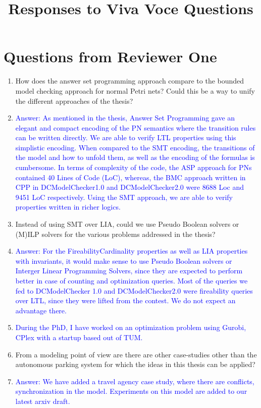 \documentclass{article}
\title{Responses to Viva Voce Questions}
\author{}
\date{}
\newcommand{\answer}[1]{\item[] \textcolor{blue}{Answer: #1}}
\begin{document}
\maketitle

\section{Questions from Reviewer One}
\begin{enumerate}
      \item  How does the answer set programming approach compare to the bounded
            model checking approach for normal Petri nets? Could this be a way to unify
            the different approaches of the thesis?
            \answer{As mentioned in the thesis, Answer Set Programming gave an elegant and compact encoding of the PN semantics where the transition rules can be written directly. We are able to verify LTL properties using this simplistic encoding. When compared to the SMT encoding, the transitions of the model and how to unfold them, as well as the encoding of the formulas is cumbersome. In terms of complexity of the code, the ASP approach for PNs contained 40 Lines of Code (LoC), whereas, the BMC approach written in CPP in DCModelChecker1.0 and DCModelChecker2.0 were 8688 Loc and 9451 LoC respectively. Using the SMT approach, we are able to verify properties written in richer logics.}
      \item Instead of using SMT over LIA, could we use Pseudo Boolean solvers or
            (M)ILP solvers for the various problems addressed in the thesis?
            \answer{For the FireabilityCardinality properties as well as LIA properties with invariants, it would make sense to use Pseudo Boolean solvers or Interger Linear Programming Solvers, since they are expected to perform better in case of counting and optimization queries. Most of the queries we fed to DCModelChecker 1.0 and DCModelChecker2.0 were fireability queries over LTL, since they were lifted from the contest. We do not expect an advantage there.}
            \item[]\textcolor{blue}{During the PhD, I have worked on an optimization problem using Gurobi, CPlex with a startup based out of TUM.}
      \item  From a modeling point of view are there are other case-studies other than the
            autonomous parking system for which the ideas in this thesis can be applied?
            \answer{We have added a travel agency case study, where there are conflicts, synchronization in the model. Experiments on this model are added to our latest arxiv draft.}
\end{enumerate}
\end{document}
